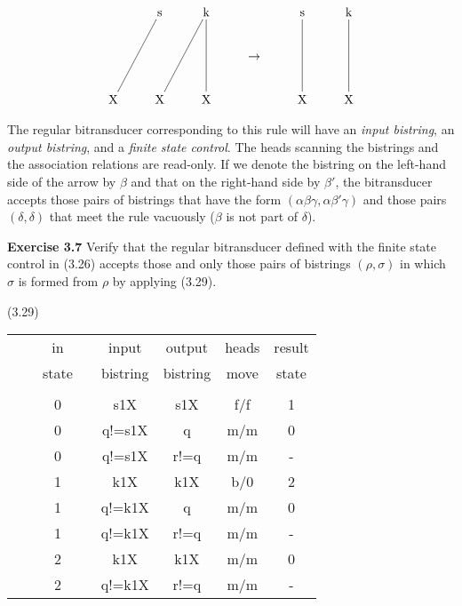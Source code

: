 \addtocounter{equation}{3}
\begin{equation}
\xymatrix{
&\text{s}\ar@{-}[ddl]&\text{k}\ar@{-}[ddl]\ar@{-}[dd]&&\text{s}\ar@{-}[dd]&\text{k}\ar@{-}[dd]\\
&&&\rightarrow&&\\
\text{X}&\text{X}&\text{X}&&\text{X}&\text{X}}
\end{equation}

\noindent
The regular bitransducer corresponding to this rule will have an {\it
input bistring}, an {\it output bistring}, and a {\it finite state
control}. The heads scanning the bistrings and the association
relations are read-only. If we denote the bistring on the left-hand
side of the arrow by $\beta$ and that on the right-hand side by
$\beta'$, the bitransducer accepts those pairs of bistrings that have
the form $(\alpha\beta\gamma,\alpha\beta'\gamma)$ and those pairs
$(\delta,\delta)$ that meet the rule vacuously ($\beta$ is not part of
$\delta$). 

\smallskip\noindent
{\bf Exercise 3.7} Verify that the regular bitransducer defined with the
finite state control in (3.26) accepts those and only those pairs of bistrings
$(\rho,\sigma)$ in which $\sigma$ is formed from $\rho$ by applying (3.29). 

\hfill (3.29)\\
\noindent
\begin{tabular}{lccccccc}
&&in&&input &output&heads&result \\
&&state&&bistring&bistring&move&state\\
&&&&&&&\\
&&0&&s1X&s1X&f/f&1\\
&&0&&q!=s1X&q&m/m&0\\
&&0&&q!=s1X&r!=q&m/m&-\\
&&1&&k1X&k1X&b/0&2\\
&&1&&q!=k1X&q&m/m&0\\
&&1&&q!=k1X&r!=q&m/m&-\\
&&2&&k1X&k1X&m/m&0\\
&&2&&q!=k1X&r!=q&m/m&-\\
\end{tabular}

